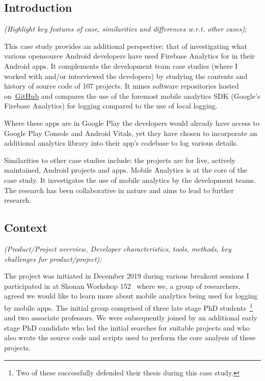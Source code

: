 \subsection{Introduction}
\emph{(Highlight key features of case, similarities and differences w.r.t. other cases);}

This case study provides an additional perspective: that of investigating what various opensource Android developers have used Firebase Analytics for in their Android apps. It complements the development team case studies (where I worked with and/or interviewed the developers) by studying the contents and history of source code of 107 projects. It mines software repositories hosted on~\href{https://github.com/}{GitHub} and compares the use of the foremost mobile analytics SDK (Google's Firebase Analytics) for logging compared to the use of local logging.

Where these apps are in Google Play the developers would already have access to Google Play Console and Android Vitals, yet they have chosen to incorporate an additional analytics library into their app's codebase to log various details. 

Similarities to other case studies include: the projects are for live, actively maintained, Android projects and apps. Mobile Analytics is at the core of the case study. It investigates the use of mobile analytics by the development teams. The research has been collaborative in nature and aims to lead to further research.


\subsection{Context}
\emph{(Product/Project overview, Developer characteristics, tools, methods, key challenges for product/project);}

The project was initiated in December 2019 during various breakout sessions I participated in at Shonan Workshop 152~\citep{nii_shonan_workshop_152} where we, a group of researchers, agreed we would like to learn more about mobile analytics being used for logging by mobile apps. The initial group comprised of three late stage PhD students~\footnote{Two of these successfully defended their thesis during this case study.} and two associate professors. We were subsequently joined by an additional early stage PhD candidate who led the initial searches for suitable projects and who also wrote the source code and scripts used to perform the core analysis of these projects.

